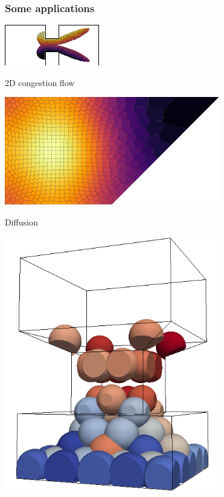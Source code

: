 \documentclass[aspectratio=169]{beamer}
\begin{document}
\begin{frame}
    \frametitle{Some applications}

    \begin{minipage}[c][0.8\textheight][c]{0.4\textwidth}
        \begin{center}
            \includegraphics[width=\textwidth]{img/pd_002.pdf}

            2D congestion flow

            \vfill
            \includegraphics[width=\textwidth]{img/pd_003.pdf}

            Diffusion
        \end{center}
    \end{minipage}
    \begin{minipage}[c][0.8\textheight][c]{0.55\textwidth}
        \begin{center}
            \includegraphics[width=0.7\textwidth]{img/pd_004.png}


\end{center}
\end{minipage}
\end{frame}
\end{document}
